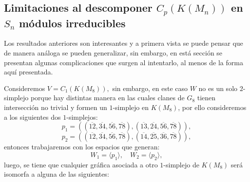 \documentclass[12pt]{book}
\theoremstyle{definition}
\newcounter{in}
\begin{document}
\subsection{Limitaciones al descomponer $C_{p}(K(M_n))$ en $S_{n}$ módulos irreducibles}
\label{Lim}
Los resultados anteriores son interesantes y a primera vista se puede
pensar que de manera análoga se pueden generalizar, sin embargo, en
está sección se presentan algunas complicaciones que surgen al
intentarlo, al menos de la forma aquí presentada.

Consideremos $V = C_{1}(K(M_{8})),$ sin embargo, en este caso $W$ no
es un solo $2$-simplejo porque hay distintas manera en las cuales
clanes de $G_{8}$ tienen intersección no trivial y formen un
$1$-simplejo en $K(M_{8})$, por ello consideremos a los siguientes dos $1$-simplejos:
\begin{equation}
p_{1} = ((\overline{12},\overline{34},\overline{56},\overline{78}),(\overline{13},\overline{24},\overline{56},\overline{78})),
\end{equation}
\begin{equation}
p_{2} = (( \overline{12},\overline{34},\overline{56},\overline{78}),(\overline{14},\overline{25},\overline{36},\overline{78})),
\end{equation}
entonces trabajaremos con los espacios que generan:
\begin{equation}
W_{1} = \langle p_{1} \rangle, \quad W_{2} = \langle p_{2} \rangle,
\end{equation}
luego, se tiene que cualquier gráfica asociada a otro $1$-simplejo de $K(M_{8})$ será isomorfa a alguna de las siguientes:
\end{document}
